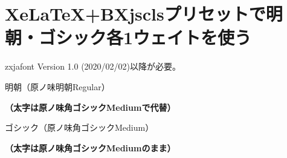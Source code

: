 \documentclass[xelatex,ja=standard,jafont=haranoaji,oneweight]{bxjsarticle}
\begin{document}
\section{Xe\LaTeX +BXjsclsプリセットで明朝・ゴシック各1ウェイトを使う}

zxjafont Version 1.0 (2020/02/02)以降が必要。

\vspace{\baselineskip}

\rmfamily
\mcfamily
\mdseries
明朝（原ノ味明朝Regular）

\bfseries
（太字は原ノ味角ゴシックMediumで代替）

\sffamily
\gtfamily
\mdseries
ゴシック（原ノ味角ゴシックMedium）

\bfseries
（太字は原ノ味角ゴシックMediumのまま）
\end{document}
